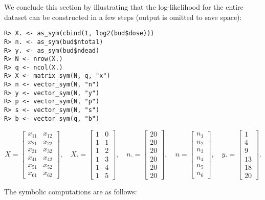 We conclude this section by illustrating that the log-likelihood for the entire dataset
can be constructed in a few steps (output is omitted to save space):

\begin{verbatim}
R> X. <- as_sym(cbind(1, log2(bud$dose)))
R> n. <- as_sym(bud$ntotal)
R> y. <- as_sym(bud$ndead)
R> N <- nrow(X.)
R> q <- ncol(X.)
R> X <- matrix_sym(N, q, "x")
R> n <- vector_sym(N, "n")
R> y <- vector_sym(N, "y")
R> p <- vector_sym(N, "p")
R> s <- vector_sym(N, "s")
R> b <- vector_sym(q, "b")
\end{verbatim}

\[
 X=\left[\begin{matrix}x_{11} & x_{12}\\x_{21} & x_{22}\\x_{31} & x_{32}\\x_{41} & x_{42}\\x_{51} & x_{52}\\x_{61} & x_{62}\end{matrix}\right], \quad
 X.=\left[\begin{matrix}1 & 0\\1 & 1\\1 & 2\\1 & 3\\1 & 4\\1 & 5\end{matrix}\right], \quad
 n.=\left[\begin{matrix}20\\20\\20\\20\\20\\20\end{matrix}\right], \quad
 n=\left[\begin{matrix}n_{1}\\n_{2}\\n_{3}\\n_{4}\\n_{5}\\n_{6}\end{matrix}\right], \quad
 y.=\left[\begin{matrix}1\\4\\9\\13\\18\\20\end{matrix}\right] .
\]

The symbolic computations are as follows:

